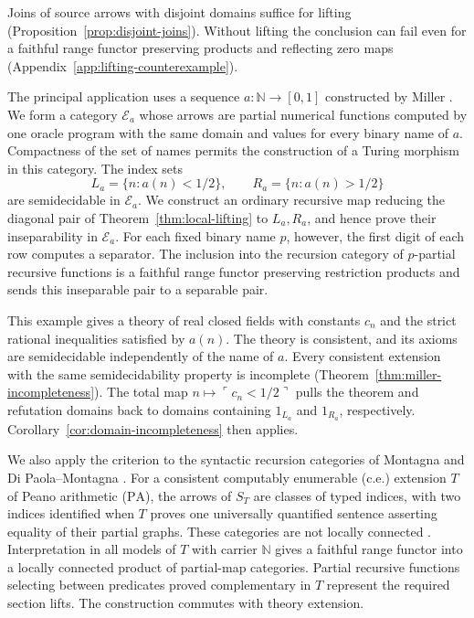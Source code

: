 \documentclass[11pt]{article}
\newcommand{\N}{\mathbb N}
\newcommand{\PA}{\mathrm{PA}}
\begin{document}
Joins of source arrows with disjoint domains suffice for lifting
(Proposition~\ref{prop:disjoint-joins}). Without lifting the conclusion
can fail even for a faithful range functor preserving products and
reflecting zero maps
(Appendix~\ref{app:lifting-counterexample}).

The principal application uses a sequence $a:\N\to[0,1]$ constructed
by Miller \cite{Miller2004}. We form a category $\mathcal E_a$ whose
arrows are partial numerical functions computed by one oracle program
with the same domain and values for every binary name of $a$.
Compactness of the set of names permits the construction of a Turing
morphism in this category. The index sets
\[
 L_a=\{n:a(n)<1/2\},\qquad R_a=\{n:a(n)>1/2\}
\]
are semidecidable in $\mathcal E_a$. We construct an ordinary recursive
map reducing the diagonal pair of Theorem~\ref{thm:local-lifting} to
$L_a,R_a$, and hence prove their inseparability in $\mathcal E_a$.
For each fixed binary name $p$, however, the first digit of each row
computes a separator. The inclusion into the recursion category of
$p$-partial recursive functions is a faithful range functor preserving
restriction products and sends this inseparable pair to a separable pair.

This example gives a theory of real closed fields with constants $c_n$
and the strict rational inequalities satisfied by $a(n)$.
The theory is consistent, and its axioms are semidecidable independently
of the name of $a$. Every consistent extension with the same
semidecidability property is incomplete
(Theorem~\ref{thm:miller-incompleteness}). The total map
$n\mapsto\ulcorner c_n<1/2\urcorner$ pulls the theorem and refutation
domains back to domains containing $1_{L_a}$ and $1_{R_a}$,
respectively. Corollary~\ref{cor:domain-incompleteness} then applies.

We also apply the criterion to the syntactic recursion categories of
Montagna and Di Paola--Montagna \cite{Montagna,DPM}.
For a consistent computably enumerable (c.e.)
extension $T$ of Peano arithmetic ($\PA$), the arrows of $S_T$ are
classes of typed indices, with two indices identified when $T$ proves
one universally quantified sentence asserting equality of their partial
graphs. These categories are not locally
connected \cite[Corollary 4.4]{DPM}. Interpretation in all models of
$T$ with carrier $\N$ gives a faithful range functor into a locally
connected product of partial-map categories. Partial recursive functions
selecting between predicates proved complementary in $T$ represent the
required section lifts.
The construction commutes with theory extension.
\end{document}
